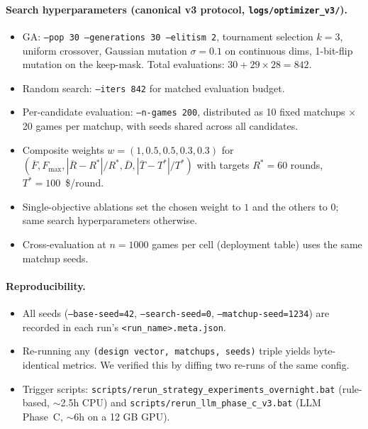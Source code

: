 \documentclass[10pt]{article}
\begin{document}
\paragraph{Search hyperparameters (canonical v3 protocol,
\texttt{logs/optimizer\_v3/}).}
\begin{itemize}[leftmargin=1.2em,itemsep=1pt]
\item GA: \texttt{--pop 30 --generations 30 --elitism 2}, tournament
selection $k{=}3$, uniform crossover, Gaussian mutation
$\sigma{=}0.1$ on continuous dims, 1-bit-flip mutation on the
keep-mask. Total evaluations: $30 + 29 \times 28 = 842$.
\item Random search: \texttt{--iters 842} for matched evaluation
budget.
\item Per-candidate evaluation: \texttt{--n-games 200}, distributed
as 10 fixed matchups $\times$ 20 games per matchup, with seeds
shared across all candidates.
\item Composite weights $w = (1, 0.5, 0.5, 0.3, 0.3)$ for
$(\overline{F}, F_{\max}, |\overline{R}-R^{*}|/R^{*},
\overline{D}, |\overline{T}-T^{*}|/T^{*})$ with targets
$R^{*} = 60$ rounds, $T^{*} = 100$~\$/round.
\item Single-objective ablations set the chosen weight to $1$ and
the others to $0$; same search hyperparameters otherwise.
\item Cross-evaluation at $n{=}1000$ games per cell (deployment
table) uses the same matchup seeds.
\end{itemize}

\paragraph{Reproducibility.}
\begin{itemize}[leftmargin=1.2em,itemsep=1pt]
\item All seeds (\texttt{--base-seed=42}, \texttt{--search-seed=0},
\texttt{--matchup-seed=1234}) are recorded in each run's
\texttt{<run\_name>.meta.json}.
\item Re-running any \texttt{(design vector, matchups, seeds)}
triple yields byte-identical metrics. We verified this by diffing
two re-runs of the same config.
\item Trigger scripts:
\texttt{scripts/rerun\_strategy\_experiments\_overnight.bat}
(rule-based, $\sim$2.5h CPU) and
\texttt{scripts/rerun\_llm\_phase\_c\_v3.bat} (LLM Phase~C,
$\sim$6h on a 12 GB GPU).
\end{itemize}

\end{document}
